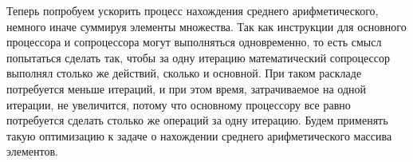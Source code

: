 \documentclass[a4paper,12pt]{article}
\begin{document}
Теперь попробуем ускорить процесс нахождения среднего арифметического, немного иначе суммируя элементы множества. Так как инструкции для основного процессора и сопроцессора могут выполняться одновременно, то есть смысл попытаться сделать так, чтобы за одну итерацию математический сопроцессор выполнял столько же действий, сколько и основной. При таком раскладе потребуется меньше итераций, и при этом время, затрачиваемое на одной итерации, не увеличится, потому что основному процессору все равно потребуется сделать столько же операций за одну итерацию. Будем применять такую оптимизацию к задаче о нахождении среднего арифметического массива элементов. 
\begin{figure}[H]\label{fig: 1sum and 2sum}
\end{figure}
\end{document}
